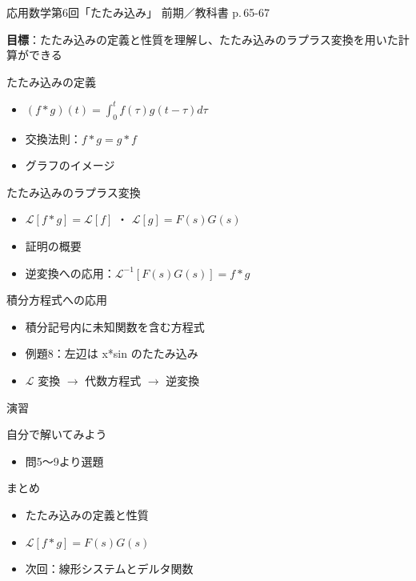 \documentclass[aspectratio=43,professionalfonts,handout]{beamer}
\newcommand{\LectureNum}{6}
\newcommand{\LectureTitle}{たたみ込み}
\newcommand{\TextPages}{p.\,65-67}
\newcommand{\CourseName}{応用数学}
\renewcommand{\TermName}{前期}
\begin{document}
\begin{frame}{\CourseName\quad 第\LectureNum 回「\LectureTitle」}
  {\small \TermName\quad \TeacherName\quad ／\quad 教科書 \TextPages}

  \textbf{目標}：たたみ込みの定義と性質を理解し、たたみ込みのラプラス変換を用いた計算ができる

\end{frame}

\begin{frame}{たたみ込みの定義}
  \begin{block}{}
  \begin{itemize}
    \item $(f*g)(t) = \int_0^t f(\tau)g(t-\tau)d\tau$
    \item 交換法則：$f*g = g*f$
    \item グラフのイメージ
  \end{itemize}
  \end{block}
\end{frame}

\begin{frame}{たたみ込みのラプラス変換}
  \begin{block}{}
  \begin{itemize}
    \item $\mathcal{L}[f*g] = \mathcal{L}[f]$ ・ $\mathcal{L}[g] = F(s)G(s)$
    \item 証明の概要
    \item 逆変換への応用：$\mathcal{L}^{-1}[F(s)G(s)] = f*g$
  \end{itemize}
  \end{block}
\end{frame}

\begin{frame}{積分方程式への応用}
  \begin{block}{}
  \begin{itemize}
    \item 積分記号内に未知関数を含む方程式
    \item 例題8：左辺は x*sin のたたみ込み
    \item $\mathcal{L}$ 変換 $ \to $ 代数方程式 $ \to $ 逆変換
  \end{itemize}
  \end{block}
\end{frame}

\begin{frame}{演習}
  \begin{exampleblock}{自分で解いてみよう}
  \begin{itemize}
    \item 問5〜9より選題
  \end{itemize}
  \end{exampleblock}
\end{frame}

\begin{frame}{まとめ}
  \begin{itemize}
    \item たたみ込みの定義と性質
    \item $\mathcal{L}[f*g] = F(s)G(s)$
    \item 次回：線形システムとデルタ関数
  \end{itemize}
\end{frame}
\end{document}
